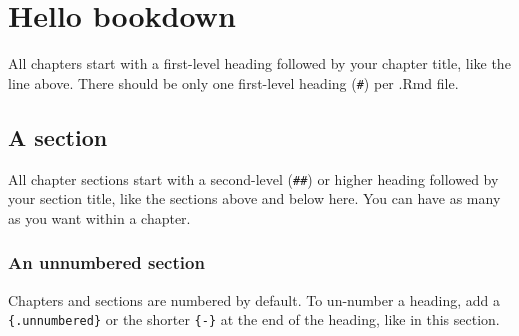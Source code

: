 \documentclass[
]{article}
\author{}
\date{\vspace{-2.5em}}
\begin{document}
\hypertarget{hello-bookdown}{%
\section{Hello bookdown}\label{hello-bookdown}}

All chapters start with a first-level heading followed by your chapter
title, like the line above. There should be only one first-level heading
(\texttt{\#}) per .Rmd file.

\hypertarget{a-section}{%
\subsection{A section}\label{a-section}}

All chapter sections start with a second-level (\texttt{\#\#}) or higher
heading followed by your section title, like the sections above and
below here. You can have as many as you want within a chapter.

\hypertarget{an-unnumbered-section}{%
\subsubsection*{An unnumbered section}\label{an-unnumbered-section}}

Chapters and sections are numbered by default. To un-number a heading,
add a \texttt{\{.unnumbered\}} or the shorter \texttt{\{-\}} at the end
of the heading, like in this section.
\end{document}
